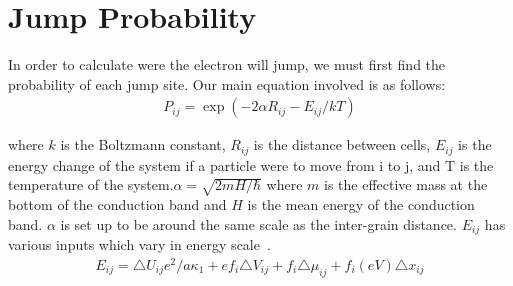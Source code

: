 \section{Jump Probability}

In order to calculate were the electron will jump, we must first find the probability of each jump site. Our main equation involved is as follows:
\begin{eqnarray}
P_{ij} = \exp (-2\alpha R_{ij} -  E_{ij}/kT)
\label{probability}
\end{eqnarray}

where $k$ is the Boltzmann constant, $R_{ij}$ is the distance between cells, $E_{ij}$ is the energy change of the system if a particle were to move from i to j, and T is the temperature of the system.$\alpha = \sqrt{2mH/\hbar}$ where $m$ is the effective mass at the bottom of the conduction band and $H$ is the mean energy of the conduction band. $\alpha$ is set up to be around the same scale as the inter-grain distance. $E_{ij}$ has various inputs which vary in energy scale~\cite{Mott68}.
\begin{eqnarray}
E_{ij} =  \triangle U_{ij} e^2/a\kappa_1  + e f_i \triangle V_{ij} + f_i  \triangle \mu_{ij} + f_i (eV) \triangle x_{ij} 
\label{deltaE}
\end{eqnarray}
